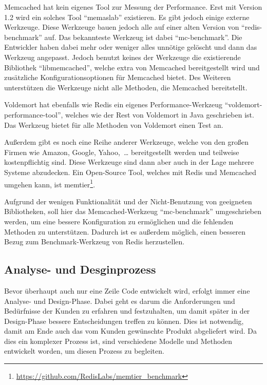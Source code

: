 Memcached hat kein eigenes Tool zur Messung der Performance. Erst mit Version
1.2 wird ein solches Tool \enquote{memaslab} existieren. Es gibt jedoch einige
externe Werkzeuge. Diese Werkzeuge bauen jedoch alle auf einer alten Version von
\enquote{redis-benchmark} auf. Das bekannteste Werkzeug ist dabei
\enquote{mc-benchmark}. Die Entwickler haben dabei mehr oder weniger alles
unnötige gelöscht und dann das Werkzeug angepasst. Jedoch benutzt keines der
Werkzeuge die existierende Bibliothek \enquote{libmemcached}, welche extra von
Memcached bereitgestellt wird und zusätzliche Konfigurationsoptionen für
Memcached bietet. Des Weiteren unterstützen die Werkzeuge nicht alle Methoden,
die Memcached bereitstellt.

Voldemort hat ebenfalls wie Redis ein eigenes Performance-Werkzeug
\enquote{voldemort-performance-tool}, welches wie der Rest von Voldemort in Java
geschrieben ist. Das Werkzeug bietet für alle Methoden von Voldemort einen
Test an.

Außerdem gibt es noch eine Reihe anderer Werkzeuge, welche von den großen
Firmen wie Amazon, Google, Yahoo,~\dots{} bereitgestellt werden und teilweise
kostenpflichtig sind. Diese Werkzeuge sind dann aber auch in der Lage mehrere
Systeme abzudecken. Ein Open-Source Tool, welches mit Redis und Memcached
umgehen kann, ist
memtier\footnote{\url{https://github.com/RedisLabs/memtier\_benchmark}}.

Aufgrund der wenigen Funktionalität und der Nicht-Benutzung von geeigneten
Bibliotheken, soll hier das Memcached-Werkzeug \enquote{mc-benchmark}
umgeschrieben werden, um eine bessere Konfiguration zu ermöglichen und die
fehlenden Methoden zu unterstützen. Dadurch ist es außerdem möglich, einen
besseren Bezug zum Benchmark-Werkzeug von Redis herzustellen.

\subsection{Analyse- und Desginprozess}
Bevor überhaupt auch nur eine Zeile Code entwickelt wird, erfolgt immer eine
Analyse- und Design-Phase. Dabei geht es darum die Anforderungen und Bedürfnisse
der Kunden zu erfahren und festzuhalten, um damit später in der Design-Phase
bessere Entscheidungen treffen zu können. Dies ist notwendig, damit am Ende auch
das vom Kunden gewünschte Produkt abgeliefert wird. Da dies ein komplexer
Prozess ist, sind verschiedene Modelle und Methoden entwickelt worden, um diesen
Prozess zu begleiten.

